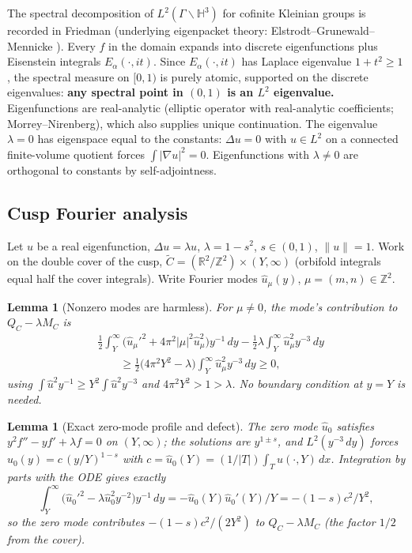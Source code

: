 \documentclass[11pt]{amsart}
\newtheorem{lemma}[theorem]{Lemma}
\newcommand{\HH}{\mathbb{H}^3}
\newcommand{\ZZ}{\mathbb{Z}}
\newcommand{\RR}{\mathbb{R}}
\begin{document}
The spectral decomposition of $L^2(\Gamma\backslash\HH)$ for cofinite
Kleinian groups is recorded in Friedman \cite[Thm.~3.8.1]{Friedman}
(underlying eigenpacket theory: Elstrodt--Grunewald--Mennicke
\cite[§6.2]{EGM98}).  Every $f$ in the domain expands into discrete
eigenfunctions plus Eisenstein integrals $E_\alpha(\cdot,it)$.  Since
$E_\alpha(\cdot,it)$ has Laplace eigenvalue $1+t^2\ge 1$, the spectral
measure on $[0,1)$ is purely atomic, supported on the discrete
eigenvalues: \textbf{any spectral point in $(0,1)$ is an $L^2$
eigenvalue.}  Eigenfunctions are real-analytic (elliptic operator with
real-analytic coefficients; Morrey--Nirenberg), which also supplies unique
continuation.  The eigenvalue $\lambda=0$ has eigenspace equal to the
constants: $\Delta u=0$ with $u\in L^2$ on a connected finite-volume
quotient forces $\int|\nabla u|^2=0$.  Eigenfunctions with $\lambda\neq 0$
are orthogonal to constants by self-adjointness.

\subsection{Cusp Fourier analysis}

Let $u$ be a real eigenfunction, $\Delta u=\lambda u$, $\lambda=1-s^2$,
$s\in(0,1)$, $\|u\|=1$.  Work on the double cover of the cusp,
$\widetilde C=(\RR^2/\ZZ^2)\times(Y,\infty)$ (orbifold integrals equal
half the cover integrals).  Write Fourier modes $\hat u_\mu(y)$,
$\mu=(m,n)\in\ZZ^2$.

\begin{lemma}[Nonzero modes are harmless]\label{lem:nonzero}
For $\mu\neq 0$, the mode's contribution to $Q_C-\lambda M_C$ is
\begin{align*}
  &\tfrac12\int_Y^\infty\bigl(\hat u_\mu'^2+4\pi^2|\mu|^2\hat u_\mu^2\bigr)
    y^{-1}\,dy
  -\tfrac12\lambda\int_Y^\infty\hat u_\mu^2 y^{-3}\,dy\\
  &\qquad\ge\tfrac12\bigl(4\pi^2 Y^2-\lambda\bigr)
    \int_Y^\infty\hat u_\mu^2 y^{-3}\,dy\ge 0,
\end{align*}
using $\int\hat u^2 y^{-1}\ge Y^2\int\hat u^2 y^{-3}$ and
$4\pi^2 Y^2>1>\lambda$.  No boundary condition at $y=Y$ is needed.
\end{lemma}

\begin{lemma}[Exact zero-mode profile and defect]\label{lem:zero}
The zero mode $\hat u_0$ satisfies $y^2 f''-yf'+\lambda f=0$ on $(Y,\infty)$;
the solutions are $y^{1\pm s}$, and $L^2(y^{-3}\,dy)$ forces
$\hat u_0(y)=c\,(y/Y)^{1-s}$ with
$c=\hat u_0(Y)=(1/|T|)\int_T u(\cdot,Y)\,dx$.  Integration by parts with
the ODE gives \emph{exactly}
\[
  \int_Y^\infty\bigl(\hat u_0'^2-\lambda\hat u_0^2 y^{-2}\bigr)y^{-1}\,dy
  =-\hat u_0(Y)\hat u_0'(Y)/Y=-(1-s)c^2/Y^2,
\]
so the zero mode contributes $-(1-s)c^2/(2Y^2)$ to $Q_C-\lambda M_C$
(the factor $1/2$ from the cover).
\end{lemma}
\end{document}
